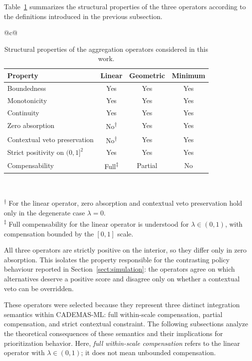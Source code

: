 \documentclass[mathematics,article,submit,moreauthors]{Definitions/mdpi}
\begin{document}
Table~\ref{tab:operator-properties} summarizes the structural
properties of the three operators according to the definitions
introduced in the previous subsection.

\begin{table}[H]
\caption{Structural properties of the aggregation operators considered in this work.}
\label{tab:operator-properties}
\centering
\renewcommand{\arraystretch}{1.3}
\begin{tabular}{@{}c@{}}
\begin{tabular}{lccc}
\toprule
Property & Linear & Geometric & Minimum \\
\midrule
Boundedness & Yes & Yes & Yes \\
Monotonicity & Yes & Yes & Yes \\
Continuity & Yes & Yes & Yes \\
Zero absorption & No\textsuperscript{\(\dagger\)} & Yes & Yes \\
Contextual veto preservation & No\textsuperscript{\(\dagger\)} & Yes & Yes \\
{\color{teal}Strict positivity on \((0,1]^2\)} & {\color{teal}Yes} & {\color{teal}Yes} & {\color{teal}Yes} \\
Compensability & Full\textsuperscript{\(\ddagger\)} & Partial & No \\
\bottomrule
\end{tabular}\\[0.4em]
\begin{minipage}{\linewidth} 
\raggedright\footnotesize
{\color{red}\textsuperscript{\(\dagger\)} For the linear operator, zero absorption and contextual veto preservation hold only in the degenerate case \(\lambda=0\).}\\
{\color{red}\textsuperscript{\(\ddagger\)} Full compensability for the linear operator is understood for \(\lambda\in(0,1)\), with compensation bounded by the \([0,1]\) scale.}
\end{minipage}
\end{tabular}
\end{table}

{\color{teal}All three operators are strictly positive on the interior, so
they differ only in zero absorption. This isolates the property
responsible for the contrasting policy behaviour reported in
Section~\ref{sect:simulation}: the operators agree on which
alternatives deserve a positive score and disagree only on whether a
contextual veto can be overridden.}

These operators were selected because they represent three distinct
integration semantics within CADEMAS-ML: {\color{blue}full within-scale}
compensation, partial compensation, and strict contextual constraint. The
following subsections analyze the theoretical consequences of these
semantics and their implications for prioritization behavior.
{\color{blue}Here, \textit{full within-scale compensation} refers to the
linear operator with \(\lambda\in(0,1)\); it does not mean unbounded
compensation.}
\end{document}
